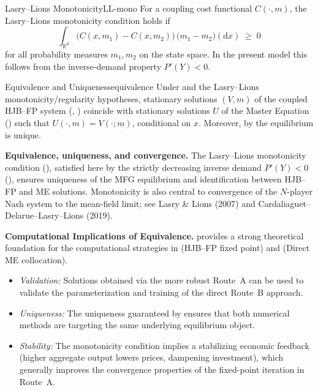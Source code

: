 ﻿\documentclass[11pt,letterpaper,oneside]{article}
\numberwithin{equation}{section}
\newcommand{\ac}[1]{{\mdseries\textsc{#1}}}
\newcommand{\1}{\mathbf{1}}
\begin{document}
\begin{definition}{Lasry--Lions Monotonicity}{LL-mono}
For a coupling cost functional $C(\cdot, m)$, the Lasry--Lions monotonicity condition holds if
\[
  \int_{\mathbb R^d} \bigl(C(x, m_1) - C(x, m_2)\bigr)\,\bigl(m_1 - m_2\bigr)(\mathrm dx) \;\ge\; 0
\]
for all probability measures $m_1, m_2$ on the state space. In the present model this follows from the inverse-demand property $P'(Y)<0$.
\end{definition}

\begin{theorem}{Equivalence and Uniqueness}{equivalence}
Under  and the Lasry--Lions monotonicity/regularity hypotheses, stationary solutions $(V,m)$ of the coupled \ac{HJB}--\ac{FP} system (, ) coincide with stationary solutions $U$ of the Master Equation () such that $U(\cdot, m) = V(\cdot; m)$, conditional on $x$. Moreover, by  the equilibrium is unique.
\end{theorem}

\begin{tcolorbox}[literaturestyle]
\textbf{Equivalence, uniqueness, and convergence.} The Lasry--Lions monotonicity condition (), satisfied here by the strictly decreasing inverse demand $P'(Y)<0$ (), ensures uniqueness of the MFG equilibrium and identification between HJB--FP and ME solutions. Monotonicity is also central to convergence of the $N$-player Nash system to the mean-field limit; see Lasry \& Lions (2007) and Cardaliaguet--Delarue--Lasry--Lions (2019).
\end{tcolorbox}

\begin{tcolorbox}[mathstyle]
\textbf{Computational Implications of Equivalence.}
 provides a strong theoretical foundation for the computational strategies in  (HJB--FP fixed point) and  (Direct ME collocation).
\begin{itemize}[leftmargin=1.15em,itemsep=0.25em]
\item \emph{Validation:} Solutions obtained via the more robust Route~A can be used to validate the parameterization and training of the direct Route~B approach.
\item \emph{Uniqueness:} The uniqueness guaranteed by  ensures that both numerical methods are targeting the same underlying equilibrium object.
\item \emph{Stability:} The monotonicity condition implies a stabilizing economic feedback (higher aggregate output lowers prices, dampening investment), which generally improves the convergence properties of the fixed-point iteration in Route~A.
\end{itemize}
\end{tcolorbox}
\end{document}
